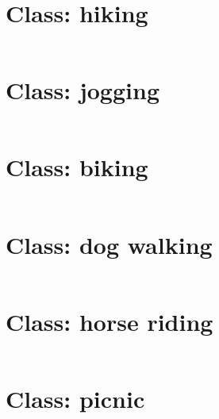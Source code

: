 \section{Class: hiking}

\inputminted[linenos]{sql}{code/hiking.txt}
\clearpage

\section{Class: jogging}

\inputminted[linenos]{sql}{code/jogging.txt}
\clearpage

\section{Class: biking}

\inputminted[linenos]{sql}{code/biking.txt}
\clearpage

\section{Class: dog walking}

\inputminted[linenos]{sql}{code/dog_walking.txt}
\clearpage

\section{Class: horse riding}

\inputminted[linenos]{sql}{code/horse_riding.txt}
\clearpage

\section{Class: picnic}

\inputminted[linenos]{sql}{code/picnic.txt}
\clearpage



